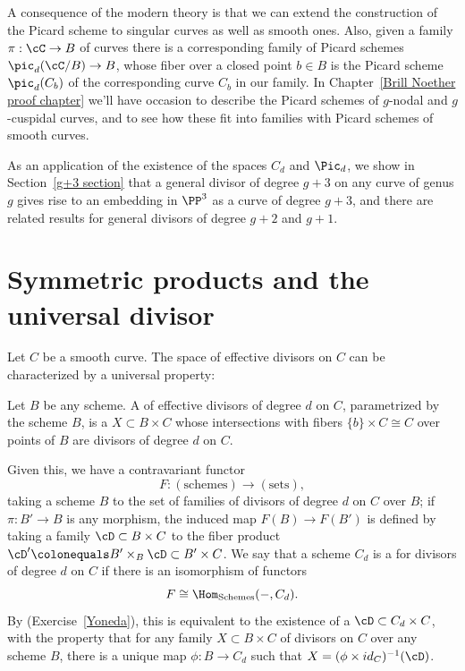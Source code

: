 A consequence of the modern theory is that we can extend the
%
construction of the Picard scheme to singular curves as well as smooth
ones. Also, given a family $\pi : \cC \to B$ of curves there is a
corresponding family of Picard schemes $\pic_d(\cC/B) \to B$, whose
fiber over a closed point $b\in B$ is the Picard scheme $\pic_d(C_b)$
of the corresponding curve $C_b$ in our family.
In Chapter~\ref{Brill Noether proof chapter} we'll have occasion to
describe the Picard schemes of $g$-nodal and $g$-cuspidal curves, and
to see how these fit into families with Picard schemes of smooth curves.

As an application of the existence of the spaces $C_d$ and $\Pic_d$, we show in Section~\ref{g+3 section} that a general divisor of degree $g+3$ on any curve of genus $g$ gives rise to an embedding in $\PP^3$ as a curve of degree $g+3$, and there are related results for general divisors of degree $g+2$ and $g+1$. 

\section{Symmetric products and the universal divisor}\label{symmetric section}

Let $C$ be a smooth curve. The space of effective divisors on $C$ can be characterized by a universal property:

\begin{definition}
Let $B$ be any scheme. A 
of effective divisors of degree
%
$d$ on $C$, parametrized by the scheme $B$, is a 
%
$X\subset B\times C$ whose intersections with fibers $\{b\} \times C
\cong C$ over points of $B$ are divisors of degree $d$ on $C$.
\end{definition}

Given this, we have a contravariant functor 
$$
F : (\textrm{schemes}) \to (\textrm{sets}),
$$
taking a scheme $B$ to the set of families of divisors of degree $d$
on $C$ over $B$; if $\pi : B' \to B$ is any morphism, the induced map
$F(B) \to F(B')$ is defined by taking a family $\cD \subset B \times C$ 
to the fiber product $\cD' \colonequals  B' \times_B \cD \subset B' \times C$. 
We say that a scheme $C_d$ is a 
%
%
for divisors of degree $d$ on $C$ if there is an isomorphism of functors
$$
F \cong \Hom_{\mathrm{Schemes}}( -, C_d).
$$
By 
%
(Exercise~\ref{Yoneda}), this is equivalent to the
existence of a 
%
$\cD \subset C_d \times C$,
with the property that for any family $X \subset B \times C$ of
divisors on $C$ over any scheme $B$, there is a unique map $\phi : B
\to C_d$ such that $X = (\phi \times id_{C})^{-1}(\cD)$.

